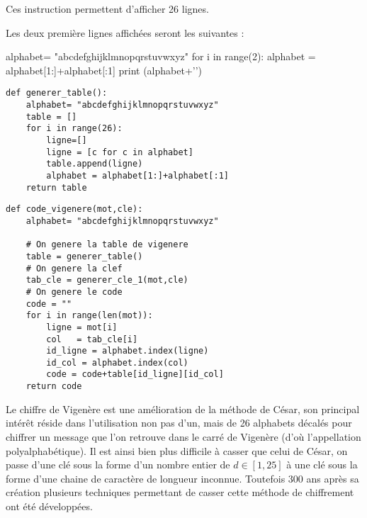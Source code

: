 \question{}

Ces instruction permettent d'afficher 26 lignes.

Les deux première lignes affichées seront les suivantes : 


\begin{pycode}
alphabet= "abcdefghijklmnopqrstuvwxyz"
for i in range(2):
    alphabet = alphabet[1:]+alphabet[:1]
    print (alphabet+'')
\end{pycode}


\question{}

\begin{center}
\begin{lstlisting}
def generer_table():
    alphabet= "abcdefghijklmnopqrstuvwxyz"
    table = []
    for i in range(26):
        ligne=[]
        ligne = [c for c in alphabet]
        table.append(ligne)
        alphabet = alphabet[1:]+alphabet[:1]
    return table
\end{lstlisting}
\end{center}

\question{}



\question{}
\begin{center}
\begin{lstlisting}
def code_vigenere(mot,cle):
    alphabet= "abcdefghijklmnopqrstuvwxyz"

    # On genere la table de vigenere
    table = generer_table()
    # On genere la clef
    tab_cle = generer_cle_1(mot,cle)
    # On genere le code
    code = ""
    for i in range(len(mot)):
        ligne = mot[i]
        col   = tab_cle[i]
        id_ligne = alphabet.index(ligne)
        id_col = alphabet.index(col)
        code = code+table[id_ligne][id_col]
    return code
\end{lstlisting}
\end{center}



\question{}

Le chiffre de Vigenère est une amélioration de la méthode de César, son principal intérêt réside dans l'utilisation non pas d'un, mais de 26 alphabets  décalés pour chiffrer un message que l'on retrouve dans le carré de Vigenère (d'où l'appellation polyalphabétique). Il est ainsi bien plus difficile à casser que celui de César, on passe d'une clé sous la forme d'un nombre entier de $d\in\left[1,25\right]$ à une clé sous la forme d'une chaine de caractère de longueur inconnue. Toutefois 300 ans après sa création plusieurs techniques permettant de casser cette méthode de chiffrement ont été développées.




